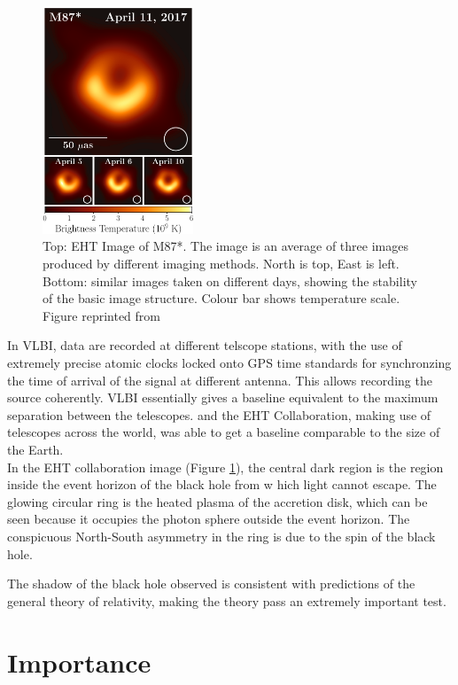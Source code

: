 \documentclass[twocolumn]{aastex63}
\begin{document}
\begin{figure}[H]
    \centering
    \includegraphics[width=0.4\textwidth]{eht_m87_cb.png}
    \caption{Top: EHT Image of M87*. The image is an average of three images produced by different imaging methods. North is top, East is left. Bottom: similar images taken on different days, showing the stability of the basic image structure. Colour bar shows temperature scale. Figure reprinted from \cite{2019ApJ...875L...1E}}
    \label{fig:eht_image}
\end{figure}

In VLBI, data are recorded at different telscope stations, with the use of extremely precise atomic clocks locked onto GPS time standards for synchronzing the time of arrival of the signal at different antenna. This allows recording the source coherently. VLBI essentially gives a baseline equivalent to the maximum separation between the telescopes. and the EHT Collaboration, making use of telescopes across the world, was able to get a baseline comparable to the size of the Earth.\\

In the EHT collaboration image (Figure \ref{fig:eht_image}), the central dark region is the region inside the event horizon of the black hole from w hich light cannot escape. The glowing circular ring is the heated plasma of the accretion disk, which can be seen because it occupies the photon sphere outside the event horizon. The conspicuous North-South asymmetry in the ring is due to the spin of the black hole.

The shadow of the black hole observed is consistent with predictions of the general theory of relativity, making the theory pass an extremely important test.

\section{Importance}
\end{document}
